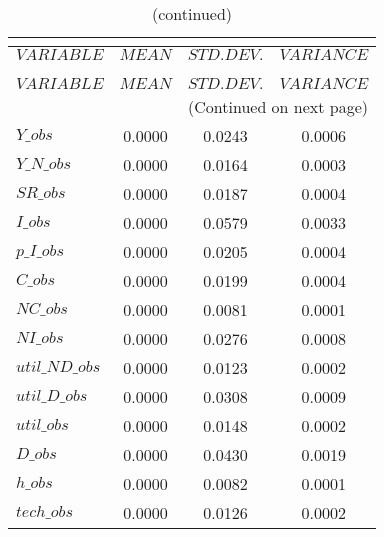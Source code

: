  
\begin{center}
\begin{longtable}{lccc} 
\caption{THEORETICAL MOMENTS}\\
 \label{Table:th_moments}\\
\toprule 
$VARIABLE       $	 & 	 $         MEAN$	 & 	 $    STD. DEV.$	 & 	 $     VARIANCE$\\
\midrule \endfirsthead 
\caption{(continued)}\\
 \toprule \\ 
$VARIABLE       $	 & 	 $         MEAN$	 & 	 $    STD. DEV.$	 & 	 $     VARIANCE$\\
\midrule \endhead 
\midrule \multicolumn{4}{r}{(Continued on next page)} \\ \bottomrule \endfoot 
\bottomrule \endlastfoot 
$Y\_obs         $	 & 	       0.0000	 & 	       0.0243	 & 	       0.0006 \\ 
$Y\_N\_obs      $	 & 	       0.0000	 & 	       0.0164	 & 	       0.0003 \\ 
$SR\_obs        $	 & 	       0.0000	 & 	       0.0187	 & 	       0.0004 \\ 
$I\_obs         $	 & 	       0.0000	 & 	       0.0579	 & 	       0.0033 \\ 
$p\_I\_obs      $	 & 	       0.0000	 & 	       0.0205	 & 	       0.0004 \\ 
$C\_obs         $	 & 	       0.0000	 & 	       0.0199	 & 	       0.0004 \\ 
$NC\_obs        $	 & 	       0.0000	 & 	       0.0081	 & 	       0.0001 \\ 
$NI\_obs        $	 & 	       0.0000	 & 	       0.0276	 & 	       0.0008 \\ 
$util\_ND\_obs  $	 & 	       0.0000	 & 	       0.0123	 & 	       0.0002 \\ 
$util\_D\_obs   $	 & 	       0.0000	 & 	       0.0308	 & 	       0.0009 \\ 
$util\_obs      $	 & 	       0.0000	 & 	       0.0148	 & 	       0.0002 \\ 
$D\_obs         $	 & 	       0.0000	 & 	       0.0430	 & 	       0.0019 \\ 
$h\_obs         $	 & 	       0.0000	 & 	       0.0082	 & 	       0.0001 \\ 
$tech\_obs      $	 & 	       0.0000	 & 	       0.0126	 & 	       0.0002 \\ 
\end{longtable}
 \end{center}
